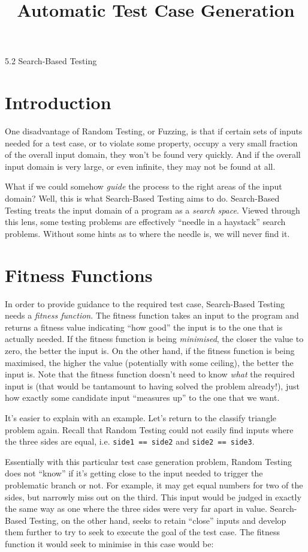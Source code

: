 



\title{Automatic Test Case Generation}{5.2 Search-Based Testing}

\section{Introduction}

One disadvantage of Random Testing, or Fuzzing, is that if certain sets of
inputs needed for a test case, or to violate some property, occupy a very small
fraction of the overall input domain, they won't be found very quickly. And if
the overall input domain is very large, or even infinite, they may not be found
at all.

What if we could somehow {\it guide} the process to the right areas of the input
domain? Well, this is what Search-Based Testing aims to do. Search-Based Testing
treats the input domain of a program as a {\it search space}. Viewed through
this lens, some testing problems are effectively ``needle in a haystack'' search
problems. Without some hints as to where the needle is, we will never find it.

\section{Fitness Functions}
In order to provide guidance to the required test case, Search-Based Testing
needs a {\it fitness function}. The fitness function takes an input to the
program and returns a {fitness value} indicating ``how good'' the input is to
the one that is actually needed. If the fitness function is being {\it
minimised}, the closer the value to zero, the better the input is. On the other
hand, if the fitness function is being maximised, the higher the value
(potentially with some ceiling), the better the input is.
%
Note that the fitness function doesn't need to know {\it what} the required
input is (that would be tantamount to having solved the problem already!), just
how exactly some candidate input ``measures up'' to the one that we want.

It's easier to explain with an example. Let's return to the classify triangle
problem again. Recall that Random Testing could not easily find inputs where the
three sides are equal, i.e. {\tt side1 == side2} and {\tt side2 == side3}.

Essentially with this particular test case generation problem, Random Testing
does not ``know'' if it's getting close to the input needed to trigger the
problematic branch or not. For example, it may get equal numbers for two of the
sides, but narrowly miss out on the third. This input would be judged in exactly
the same way as one where the three sides were very far apart in value.
Search-Based Testing, on the other hand, seeks to retain ``close'' inputs and
develop them further to try to seek to execute the goal of the test case. The
fitness function it would seek to minimise in this case would be:

